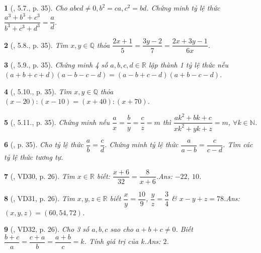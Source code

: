\documentclass{article}
\newtheorem{baitoan}{}
\begin{document}
\begin{baitoan}[\cite{Binh_boi_duong_Toan_7_tap_1}, 5.7., p. 35]
	Cho $abcd\ne0,b^2 = ca,c^2 = bd$. Chứng minh tỷ lệ thức $\dfrac{a^3 + b^3 + c^3}{b^3 + c^3 + d^3} = \dfrac{a}{d}$.
\end{baitoan}

\begin{baitoan}[\cite{Binh_boi_duong_Toan_7_tap_1}, 5.8., p. 35]
	Tìm $x,y\in\mathbb{Q}$ thỏa $\dfrac{2x + 1}{5} = \dfrac{3y - 2}{7} = \dfrac{2x + 3y - 1}{6x}$.
\end{baitoan}

\begin{baitoan}[\cite{Binh_boi_duong_Toan_7_tap_1}, 5.9., p. 35]
	Chứng minh 4 số $a,b,c,d\in\mathbb{R}$ lập thành 1 tỷ lệ thức nếu $(a + b + c + d)(a - b - c - d) = (a - b + c - d)(a + b - c - d)$.
\end{baitoan}

\begin{baitoan}[\cite{Binh_boi_duong_Toan_7_tap_1}, 5.10., p. 35]
	Tìm $x,y\in\mathbb{Q}$ thỏa $(x - 20):(x - 10) = (x + 40):(x + 70)$.
\end{baitoan}

\begin{baitoan}[\cite{Binh_boi_duong_Toan_7_tap_1}, 5.11., p. 35]
	Chứng minh nếu $\dfrac{a}{x} = \dfrac{b}{y} = \dfrac{c}{z} = m$ thì $\dfrac{ak^2 + bk + c}{xk^2 + yk + z} = m$, $\forall k\in\mathbb{N}$.
\end{baitoan}

\begin{baitoan}[\cite{Binh_boi_duong_Toan_7_tap_1}, p. 35]
	Cho tỷ lệ thức $\dfrac{a}{b} = \dfrac{c}{d}$. Chứng minh tỷ lệ thức $\dfrac{a}{a - b} = \dfrac{c}{c - d}$. Tìm các tỷ lệ thức tương tự.
\end{baitoan}

\begin{baitoan}[\cite{Tuyen_Toan_7}, VD30, p. 26]
	Tìm $x\in\mathbb{R}$ biết: $\dfrac{x + 6}{32} = \dfrac{8}{x + 6}$.\hfill{\sf Ans:} $-22$, $10$.
\end{baitoan}

\begin{baitoan}[\cite{Tuyen_Toan_7}, VD31, p. 26]
	Tìm $x,y,z\in\mathbb{R}$ biết $\dfrac{x}{y} = \dfrac{10}{9}$, $\dfrac{y}{z} = \dfrac{3}{4}$ \& $x - y + z = 78$.\hfill{\sf Ans:} $(x,y,z) = (60,54,72)$.
\end{baitoan}

\begin{baitoan}[\cite{Tuyen_Toan_7}, VD32, p. 26]
	Cho 3 số $a,b,c$ sao cho $a + b + c\ne 0$. Biết $\dfrac{b + c}{a} = \dfrac{c + a}{b} = \dfrac{a + b}{c} = k$. Tính giá trị của $k$.\hfill{\sf Ans:} $2$.
\end{baitoan}
\end{document}
